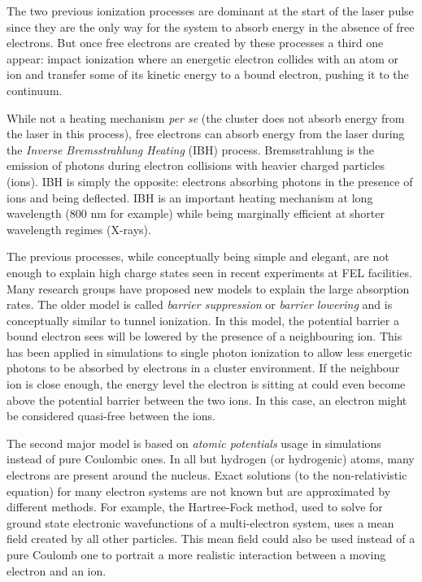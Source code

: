 The two previous ionization processes are dominant at the start of the laser
pulse since they are the only way for the system to absorb energy in the
absence of free electrons. But once free electrons are created by these
processes a third one appear: impact ionization where an energetic electron
collides with an atom or ion and transfer some of its kinetic energy to a bound
electron, pushing it to the continuum.

While not a heating mechanism \textit{per se} (the cluster does not absorb
energy from the laser in this process), free electrons can absorb energy from
the laser during the \textit{Inverse Bremsstrahlung Heating} (IBH) process.
Bremsstrahlung is the emission of photons during electron collisions with
heavier charged particles (ions). IBH is simply the opposite: electrons
absorbing photons in the presence of ions and being deflected. IBH is an
important heating mechanism at long wavelength (800 nm for example) while being
marginally efficient at shorter wavelength regimes (X-rays).

The previous processes, while conceptually being simple and elegant, are not
enough to explain high charge states seen in recent experiments at FEL
facilities. Many research groups have proposed new models to
explain the large absorption rates. The older model is called \textit{barrier
suppression} or \textit{barrier lowering} and is conceptually similar to tunnel
ionization. In this model, the potential barrier a bound electron sees will be
lowered by the presence of a neighbouring ion. This has been applied in
simulations to single photon ionization to allow less energetic photons to be
absorbed by electrons in a cluster environment. If the neighbour ion is close
enough, the energy level the electron is sitting at could even become above the
potential barrier between the two ions. In this case, an electron might be
considered quasi-free between the ions.

The second major model is based on \textit{atomic potentials} usage in
simulations instead of pure Coulombic ones. In all but hydrogen (or hydrogenic)
atoms, many electrons are present around the nucleus. Exact solutions (to the
non-relativistic \schrodinger equation) for many electron systems are not known
but are approximated by different methods. For example, the Hartree-Fock
method, used to solve for ground state electronic wavefunctions of a
multi-electron system, uses a mean field created by all other particles. This
mean field could also be used instead of a pure Coulomb one to portrait a more
realistic interaction between a moving electron and an ion.


